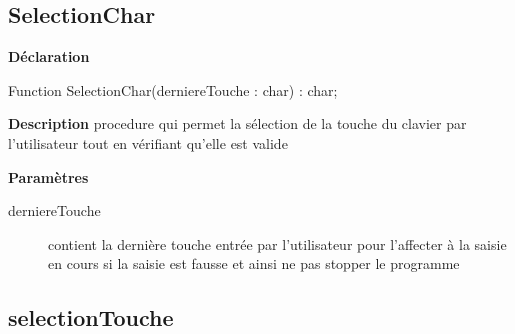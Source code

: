 \documentclass{report}
\newif\ifpdf
\begin{document}
\subsection*{SelectionChar}
\fi
\label{Jouer-SelectionChar}
\begin{list}{}{
\setlength{\itemindent}{0cm}
\setlength{\listparindent}{0cm}
\setlength{\leftmargin}{\evensidemargin}
\addtolength{\leftmargin}{\tmplength}
\settowidth{\labelsep}{X}
\addtolength{\leftmargin}{\labelsep}
\setlength{\labelwidth}{\tmplength}
}
\item[\textbf{Déclaration}\hfill]
\ifpdf
\begin{flushleft}
\fi
\begin{ttfamily}
Function SelectionChar(derniereTouche : char) : char;\end{ttfamily}

\ifpdf
\end{flushleft}
\fi

\par
\item[\textbf{Description}]
procedure qui permet la sélection de la touche du clavier par l'utilisateur tout en vérifiant qu'elle est valide \par
\item[\textbf{Paramètres}]
\begin{description}
\item[derniereTouche] contient la dernière touche entrée par l'utilisateur pour l'affecter à la saisie en cours si la saisie est fausse et ainsi ne pas stopper le programme
\end{description}


\end{list}
\ifpdf
\subsection*{\large{\textbf{selectionTouche}}\normalsize\hspace{1ex}\hrulefill}
\else
\end{document}
